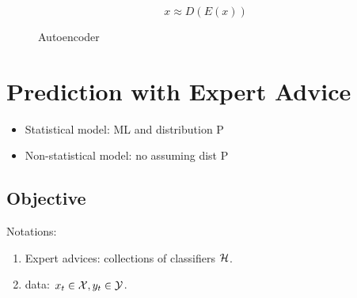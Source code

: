 \documentclass[a4paper]{report}
\begin{document}
$$
x \approx D(E(x))
$$

\begin{figure}[!htp]
\centering
{}
\caption{Autoencoder}
\label{fig:autoencoder}
\end{figure}

\chapter{Prediction with Expert Advice}
\begin{itemize}
\item Statistical model: ML and distribution P
\item Non-statistical model: no assuming dist P
\end{itemize}

\section{Objective}
Notations:
\begin{enumerate}
\item Expert advices: collections of classifiers $\mathcal{H}$.
\item data: $x_t \in \mathcal{X}, y_t \in \mathcal{Y}$.
\end{enumerate}
\end{document}
